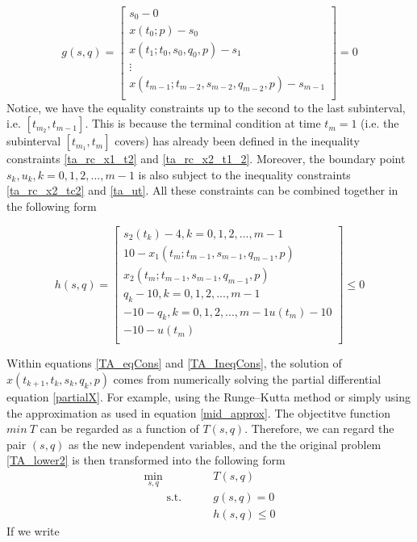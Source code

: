 \documentclass  [
  paper    = a4,
  BCOR     = 10mm,
  twoside,
  fontsize = 12pt,
  fleqn,
  toc      = bibnumbered,
  toc      = listofnumbered,
  numbers  = noendperiod,
  headings = normal,
  listof   = leveldown,
  version  = 3.03
]                                       {scrreprt}
\newcommand{\<}{\langle}
\renewcommand{\>}{\rangle}
\begin{document}
\begin{equation}
	g(s,q) = \begin{bmatrix}
		s_0 -0 \\
		x(t_0; p) - s_0  \\
		x(t_1; t_0, s_0, q_0, p) - s_1 \\ 
		\vdots \\
		x(t_{m-1}; t_{m-2}, s_{m-2}, q_{m-2}, p) - s_{m-1} \\
	\end{bmatrix} = 0
  \label{TA_eqCons}
\end{equation}
Notice, we have the equality constraints up to the second to the last subinterval, i.e. $[t_{m_2}, t_{m-1}]$. This is because the terminal condition at time $t_m =1$ (i.e. the subinterval $[t_{m_1}, t_m]$ covers) has already been defined in the inequality constraints \ref{ta_rc_x1_t2} and \ref{ta_rc_x2_t1_2}. Moreover, the boundary point $s_k, u_k, k = 0, 1, 2, ..., m-1$ is also subject to the inequality constraints \ref{ta_rc_x2_tc2} and \ref{ta_ut}. All these constraints can be combined together in the following form

\begin{equation}
	h(s,q) = \begin{bmatrix}
		s_2(t_k) - 4, k =0, 1, 2, ..., m-1  \\
		10 - x_1(t_m; t_{m-1}, s_{m-1}, q_{m-1}, p)\\ 
		x_2(t_m; t_{m-1}, s_{m-1}, q_{m-1}, p) \\
		q_k - 10,   k =0, 1, 2, ..., m-1 \\
		-10 - q_k,  k =0, 1, 2, ..., m-1 
		u(t_m) - 10 \\
		-10 - u(t_m) \\
	\end{bmatrix} \leq 0
\label{TA_IneqCons}
\end{equation}

Within equations \ref{TA_eqCons} and \ref{TA_IneqCons}, the solution of $x(t_{k+1}, t_k, s_k, q_k, p)$ comes from numerically solving the partial differential equation \ref{partialX}. For example, using the Runge–Kutta method or simply using the approximation as used in equation \ref{mid_approx}. 
The objectitve function $min \ T$ can be regarded as a function of $T(s, q)$. Therefore, we can regard the pair $(s,q)$ as the new independent variables, and the the original problem \ref{TA_lower2} is then transformed into the following form
\begin{equation}
	\label{TA_Transform}
	\begin{aligned}
		\underset{s, q}{\text{min}} \qquad & T(s, q)	\\
		\qquad \text{s.t.}\qquad	&  g(s,q) = 0   \\
		&  h(s, q)	\leq 0 
	\end{aligned}
\end{equation}
If we write 
\end{document}
